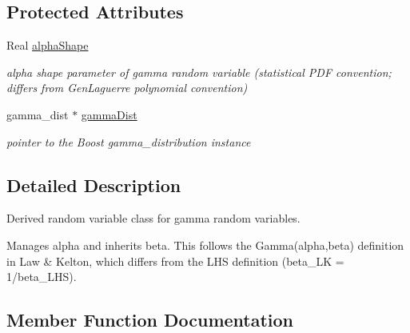 \subsection*{Protected Attributes}
\begin{DoxyCompactItemize}
\item 
Real \hyperlink{classPecos_1_1GammaRandomVariable_af2fa8d657b4ae8750d30b09f10760799}{alpha\+Shape}\label{classPecos_1_1GammaRandomVariable_af2fa8d657b4ae8750d30b09f10760799}

\begin{DoxyCompactList}\small\item\em alpha shape parameter of gamma random variable (statistical P\+DF convention; differs from Gen\+Laguerre polynomial convention) \end{DoxyCompactList}\item 
gamma\+\_\+dist $\ast$ \hyperlink{classPecos_1_1GammaRandomVariable_a284f48d0d01e3e0acf2cd606fab6f71d}{gamma\+Dist}\label{classPecos_1_1GammaRandomVariable_a284f48d0d01e3e0acf2cd606fab6f71d}

\begin{DoxyCompactList}\small\item\em pointer to the Boost gamma\+\_\+distribution instance \end{DoxyCompactList}\end{DoxyCompactItemize}


\subsection{Detailed Description}
Derived random variable class for gamma random variables. 

Manages alpha and inherits beta. This follows the Gamma(alpha,beta) definition in Law \& Kelton, which differs from the L\+HS definition (beta\+\_\+\+LK = 1/beta\+\_\+\+L\+HS). 

\subsection{Member Function Documentation}
